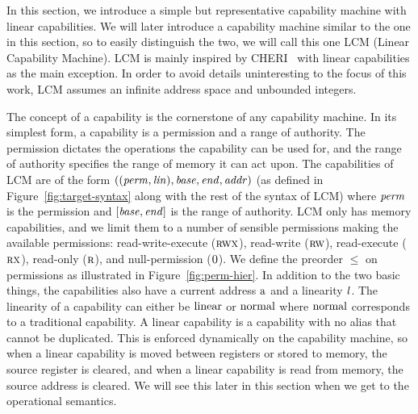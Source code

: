 \documentclass[acmsmall,review,anonymous]{acmart}\settopmatter{printfolios=true,printccs=false,printacmref=false}
\newcommand{\trgcm}{\textsc{LCM}}
\begin{document}
In this section, we introduce a simple but representative capability machine with linear capabilities.
We will later introduce a capability machine similar to the one in this section, so to easily distinguish the two, we will call this one \trgcm{} (Linear Capability Machine).
\trgcm{} is mainly inspired by CHERI~\citep{watson_cheri:_2015} with linear capabilities as the main exception.
In order to avoid details uninteresting to the focus of this work, \trgcm{} assumes an infinite address space and unbounded integers.

The concept of a capability is the cornerstone of any capability machine.
In its simplest form, a capability is a permission and a range of authority.
The permission dictates the operations the capability can be used for, and the range of authority specifies the range of memory it can act upon.
The capabilities of \trgcm{} are of the form $((\mathit{perm},\mathit{lin}),\mathit{base},\mathit{end},\mathit{addr})$ (as defined in Figure~\ref{fig:target-syntax} along with the rest of the syntax of \trgcm{}) where $\mathit{perm}$ is the permission and $[\mathit{base},\mathit{end}]$ is the range of authority.
\trgcm{} only has memory capabilities, and we limit them to a number of sensible permissions making the available permissions: read-write-execute ($\textsc{rwx}$), read-write ($\textsc{rw}$), read-execute ($\textsc{rx}$), read-only ($\textsc{r}$), and null-permission ($\textsc{0}$).
We define the preorder $\le$ on permissions as illustrated in Figure~\ref{fig:perm-hier}.
In addition to the two basic things, the capabilities also have a current address $\mathrm{a}$ and a linearity $\mathit{l}$. The linearity of a capability can either be $\mathrm{linear}$ or $\mathrm{normal}$ where $\mathrm{normal}$ corresponds to a traditional capability.
A linear capability is a capability with no alias that cannot be duplicated.
This is enforced dynamically on the capability machine, so when a linear capability is moved between registers or stored to memory, the source register is cleared, and when a linear capability is read from memory, the source address is cleared. We will see this later in this section when we get to the operational semantics.
\end{document}
